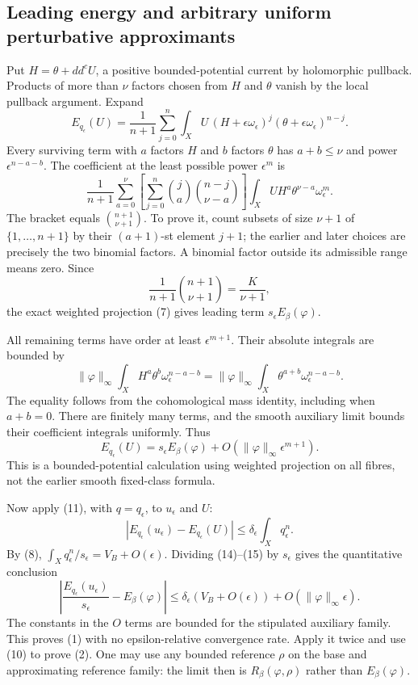 \documentclass[
  11pt,
]{article}
\begin{document}
\subsection{Leading energy and arbitrary uniform perturbative
approximants}\label{leading-energy-and-arbitrary-uniform-perturbative-approximants}

Put \(H=\theta+dd^cU\), a positive bounded-potential current by
holomorphic pullback. Products of more than \(\nu\) factors chosen from
\(H\) and \(\theta\) vanish by the local pullback argument. Expand
\[E_{q_\epsilon}(U)
=\frac1{n+1}\sum_{j=0}^n\int_XU\,(H+\epsilon\omega_\epsilon)^j
(\theta+\epsilon\omega_\epsilon)^{n-j}.\] Every surviving term with
\(a\) factors \(H\) and \(b\) factors \(\theta\) has \(a+b\leq\nu\) and
power \(\epsilon^{n-a-b}\). The coefficient at the least possible power
\(\epsilon^m\) is \[\frac1{n+1}\sum_{a=0}^\nu
\left[\sum_{j=0}^n\binom ja\binom{n-j}{\nu-a}\right]
\int_XU H^a\theta^{\nu-a}\omega_\epsilon^m.\] The bracket equals
\(\binom{n+1}{\nu+1}\). To prove it, count subsets of size \(\nu+1\) of
\(\{1,\ldots,n+1\}\) by their \((a+1)\)-st element \(j+1\); the earlier
and later choices are precisely the two binomial factors. A binomial
factor outside its admissible range means zero. Since
\[\frac1{n+1}\binom{n+1}{\nu+1}=\frac K{\nu+1},\] the exact weighted
projection (7) gives leading term \(s_\epsilon E_\beta(\varphi)\).

All remaining terms have order at least \(\epsilon^{m+1}\). Their
absolute integrals are bounded by
\[\|\varphi\|_\infty\int_XH^a\theta^b\omega_\epsilon^{n-a-b}
=\|\varphi\|_\infty\int_X\theta^{a+b}\omega_\epsilon^{n-a-b}.\] The
equality follows from the cohomological mass identity, including when
\(a+b=0\). There are finitely many terms, and the smooth auxiliary limit
bounds their coefficient integrals uniformly. Thus
\[E_{q_\epsilon}(U)=s_\epsilon E_\beta(\varphi)
+O(\|\varphi\|_\infty\epsilon^{m+1}). \tag{14}\] This is a
bounded-potential calculation using weighted projection on all fibres,
not the earlier smooth fixed-class formula.

Now apply (11), with \(q=q_\epsilon\), to \(u_\epsilon\) and \(U\):
\[|E_{q_\epsilon}(u_\epsilon)-E_{q_\epsilon}(U)|
\leq\delta_\epsilon\int_Xq_\epsilon^n. \tag{15}\] By (8),
\(\int_Xq_\epsilon^n/s_\epsilon=V_B+O(\epsilon)\). Dividing (14)--(15)
by \(s_\epsilon\) gives the quantitative conclusion
\[\left|\frac{E_{q_\epsilon}(u_\epsilon)}{s_\epsilon}-E_\beta(\varphi)\right|
\leq\delta_\epsilon(V_B+O(\epsilon))
+O(\|\varphi\|_\infty\epsilon). \tag{16}\] The constants in the \(O\)
terms are bounded for the stipulated auxiliary family. This proves (1)
with no epsilon-relative convergence rate. Apply it twice and use (10)
to prove (2). One may use any bounded reference \(\rho\) on the base and
approximating reference family: the limit then is
\(R_\beta(\varphi,\rho)\) rather than \(E_\beta(\varphi)\).
\end{document}
